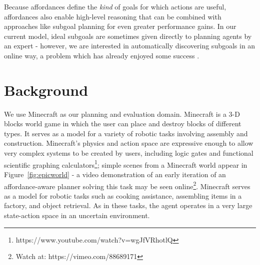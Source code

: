 \documentclass[conference]{IEEEtran}
\begin{document}
Because affordances define the {\em kind} of goals for which actions
are useful, affordances also enable high-level reasoning that can be
combined with approaches like subgoal planning for even
greater performance gains. In our current model, ideal subgoals are
sometimes given directly to planning agents by an expert - however, we are
interested in automatically discovering subgoals in an online way, a
problem which has already enjoyed some success
\cite{Mcgovern01automaticdiscovery,Simsek:2005:IUS:1102351.1102454}.


\section{Background}
\label{sec:background}

We use Minecraft as our planning and evaluation domain. Minecraft is a
3-D blocks world game in which the user can place and destroy blocks
of different types.   It serves as a model for a variety of robotic tasks involving assembly and construction.  Minecraft's physics and action space are expressive
enough to allow very complex systems to be created by users, including logic gates and 
functional scientific graphing calculators\footnote{https://www.youtube.com/watch?v=wgJfVRhotlQ};
simple scenes from a Minecraft world appear in Figure~\ref{fig:epicworld} - a video demonstration of
an early iteration of an affordance-aware planner solving this task may be seen online\footnote{Watch at: https://vimeo.com/88689171}.
Minecraft serves as a model for robotic tasks such as cooking assistance, assembling items in a factory, 
and object retrieval.  As in these tasks, the agent operates in a very large state-action space in an uncertain environment.
\end{document}
